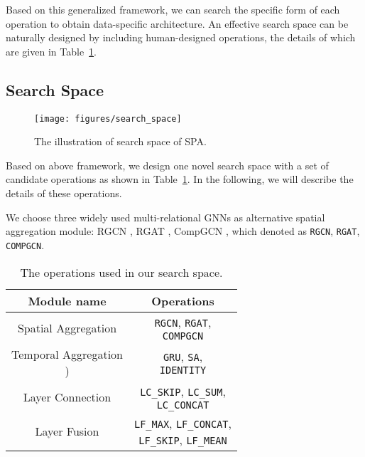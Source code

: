 \documentclass[11pt]{article}
\begin{document}
Based on this generalized framework, 
we can search the specific form of each operation 
to obtain data-specific architecture.
An effective search space can be naturally designed by 
including human-designed operations, 
the details of which are given in Table~\ref{tab-search-space}.

\subsection{Search Space}\label{sec-search-space}

\begin{figure}[t]
	\centering
	\texttt{[image: figures/search\_space]}
	\caption{The illustration of search space of SPA.}
	\label{fig-search_space}
	\vspace{-8px}
\end{figure}

Based on above framework, 
we design one novel search space with a set of candidate operations 
as shown in Table~\ref{tab-search-space}. 
In the following, 
we will describe the details of these operations.

 We choose three widely used multi-relational GNNs as alternative spatial aggregation module: RGCN \citep{schlichtkrull2018modeling}, RGAT \citep{busbridge2019relational}, CompGCN \citep{vashishth2020composition}, which denoted as \texttt{RGCN}, \texttt{RGAT}, \texttt{COMPGCN}.

\begin{table}[tb]
	\centering
	\setlength\tabcolsep{3.5pt}
	\begin{tabular}{cc}
		\toprule
		\textbf{Module name} & \textbf{Operations}               \\
		\midrule
		\makecell[c]{Spatial Aggregation  \\ }  & \makecell[c]{\texttt{RGCN}, \texttt{RGAT},  \\ \texttt{COMPGCN}}                              \\
		\makecell[c]{Temporal Aggregation \\)} & \makecell[c]{\texttt{GRU}, \texttt{SA}, \\ \texttt{IDENTITY}}                                \\
		\makecell[c]{Layer Connection \\}     & \makecell[c]{\texttt{LC\_SKIP}, \texttt{LC\_SUM}, \\ \texttt{LC\_CONCAT}}                    \\
		\makecell[c]{Layer Fusion \\}         & \makecell[c]{\texttt{LF\_MAX}, \texttt{LF\_CONCAT},\\ \texttt{LF\_SKIP}, \texttt{LF\_MEAN}} \\
		\bottomrule
	\end{tabular}
\caption{The operations used in our search space.}
	\label{tab-search-space}
	\vspace{-8px}
\end{table}
\end{document}
